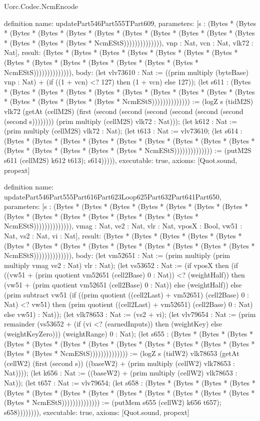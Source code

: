 \begin{lexlean}{Uorc.Codec.NcmEncode}
\begin{semanticmodule}
definition{
  name: updatePart546Part555TPart609,
  parameters: [s : (Bytes * (Bytes * (Bytes * (Bytes * (Bytes * (Bytes * (Bytes * (Bytes * (Bytes * (Bytes * (Bytes * (Bytes * (Bytes * (Bytes * NcmEStS)))))))))))))), vnp : Nat, vcn : Nat, vlk72 : Nat],
  result: (Bytes * (Bytes * (Bytes * (Bytes * (Bytes * (Bytes * (Bytes * (Bytes * (Bytes * (Bytes * (Bytes * (Bytes * (Bytes * (Bytes * NcmEStS)))))))))))))),
  body: (let vlv73610 : Nat := ((prim multiply (byteBase) vnp : Nat) + (if ((1 + vcn) <? 127) then (1 + vcn) else 127)); (let s611 : (Bytes * (Bytes * (Bytes * (Bytes * (Bytes * (Bytes * (Bytes * (Bytes * (Bytes * (Bytes * (Bytes * (Bytes * (Bytes * (Bytes * NcmEStS)))))))))))))) := (logZ s (tidM2S) vlk72 (getAt (cellM2S) (first (second (second (second (second (second (second (second s)))))))) (prim multiply (cellM2S) vlk72 : Nat))); (let k612 : Nat := (prim multiply (cellM2S) vlk72 : Nat); (let t613 : Nat := vlv73610; (let s614 : (Bytes * (Bytes * (Bytes * (Bytes * (Bytes * (Bytes * (Bytes * (Bytes * (Bytes * (Bytes * (Bytes * (Bytes * (Bytes * (Bytes * NcmEStS)))))))))))))) := (putM2S s611 (cellM2S) k612 t613); s614))))),
  executable: true,
  axioms: [Quot.sound, propext]
}

definition{
  name: updatePart546Part555Part616Part623Loop625Part632Part641Part650,
  parameters: [s : (Bytes * (Bytes * (Bytes * (Bytes * (Bytes * (Bytes * (Bytes * (Bytes * (Bytes * (Bytes * (Bytes * (Bytes * (Bytes * (Bytes * NcmEStS)))))))))))))), vmag : Nat, ve2 : Nat, vlr : Nat, vposX : Bool, vw51 : Nat, vs2 : Nat, vi : Nat],
  result: (Bytes * (Bytes * (Bytes * (Bytes * (Bytes * (Bytes * (Bytes * (Bytes * (Bytes * (Bytes * (Bytes * (Bytes * (Bytes * (Bytes * NcmEStS)))))))))))))),
  body: (let vm52651 : Nat := (prim multiply (prim multiply vmag ve2 : Nat) vlr : Nat); (let vs53652 : Nat := (if vposX then (if ((vw51 + (prim quotient vm52651 (cell2Base) 0 : Nat)) <? (weightHalf)) then (vw51 + (prim quotient vm52651 (cell2Base) 0 : Nat)) else (weightHalf)) else (prim subtract vw51 (if ((prim quotient ((cell2Last) + vm52651) (cell2Base) 0 : Nat) <? vw51) then (prim quotient ((cell2Last) + vm52651) (cell2Base) 0 : Nat) else vw51) : Nat)); (let vlk78653 : Nat := (vs2 + vi); (let vlv79654 : Nat := (prim remainder (vs53652 + (if (vi <? (earnedInputs)) then (weightKey) else (weightKeyZero))) (weightRange) 0 : Nat); (let s655 : (Bytes * (Bytes * (Bytes * (Bytes * (Bytes * (Bytes * (Bytes * (Bytes * (Bytes * (Bytes * (Bytes * (Bytes * (Bytes * (Bytes * NcmEStS)))))))))))))) := (logZ s (tidW2) vlk78653 (getAt (cellW2) (first (second s)) ((baseW2) + (prim multiply (cellW2) vlk78653 : Nat)))); (let k656 : Nat := ((baseW2) + (prim multiply (cellW2) vlk78653 : Nat)); (let t657 : Nat := vlv79654; (let s658 : (Bytes * (Bytes * (Bytes * (Bytes * (Bytes * (Bytes * (Bytes * (Bytes * (Bytes * (Bytes * (Bytes * (Bytes * (Bytes * (Bytes * NcmEStS)))))))))))))) := (putMem s655 (cellW2) k656 t657); s658)))))))),
  executable: true,
  axioms: [Quot.sound, propext]
}


\end{semanticmodule}
\end{lexlean}
